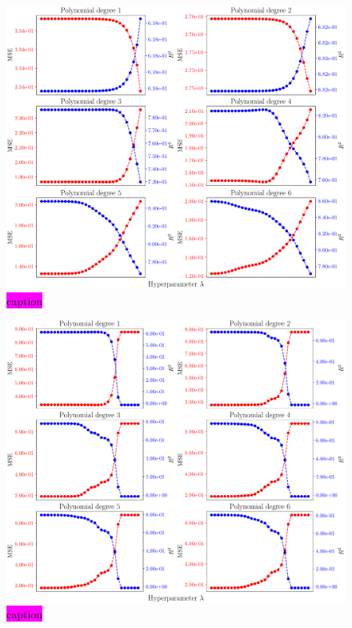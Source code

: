 \documentclass[aps,pra,english,notitlepage,reprint,nofootinbib]{revtex4-1}  %
\begin{document}
\begin{figure}
  \vspace*{-5pt}
  \centering %
  \includegraphics[width=\textwidth]{../figs/b_MSE_R2.pdf}
  \caption{\colorbox{magenta}{caption}}\label{fig:b MSE R2}
  \vspace*{-5pt}
\end{figure}

\begin{figure}
  \vspace*{-5pt}
  \centering %
  \includegraphics[width=\textwidth]{../figs/c_MSE_R2.pdf}
  \caption{\colorbox{magenta}{caption}}\label{fig:c MSE R2}
  \vspace*{-5pt}
\end{figure}
\end{document}

